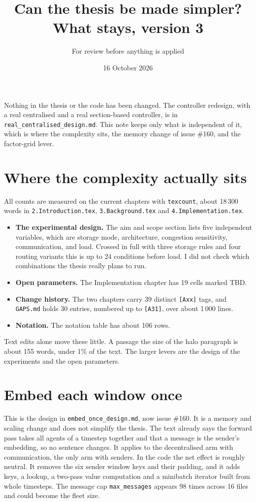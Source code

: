 \documentclass[11pt,a4paper]{article}
\title{Can the thesis be made simpler?\\[2pt]\large What stays, version 3}
\author{For review before anything is applied}
\date{16 October 2026}
\newcommand{\file}[1]{\texttt{#1}}
\begin{document}
\sloppy
\maketitle

\noindent Nothing in the thesis or the code has been changed. The controller
redesign, with a real centralised and a real section-based controller, is in
\file{real\_centralised\_design.md}. This note keeps only what is independent of
it, which is where the complexity sits, the memory change of issue \#160, and the
factor-grid lever.

\section{Where the complexity actually sits}

All counts are measured on the current chapters with \file{texcount}, about
18\,300 words in \file{2.Introduction.tex}, \file{3.Background.tex} and
\file{4.Implementation.tex}.

\begin{itemize}[noitemsep]
  \item \textbf{The experimental design.} The aim and scope section lists five
    independent variables, which are storage mode, architecture, congestion
    sensitivity, communication, and load. Crossed in full with three storage
    rules and four routing variants this is up to 24 conditions before load.
    I did not check which combinations the thesis really plans to run.
  \item \textbf{Open parameters.} The Implementation chapter has 19 cells
    marked TBD.
  \item \textbf{Change history.} The two chapters carry 39 distinct
    \texttt{[Axx]} tags, and \file{GAPS.md} holds 30 entries, numbered up to
    \texttt{[A31]}, over about 1\,000 lines.
  \item \textbf{Notation.} The notation table has about 106 rows.
\end{itemize}

Text edits alone move these little. A passage the size of the halo paragraph is
about 155 words, under 1\% of the text. The larger levers are the design of the
experiments and the open parameters.

\section{Embed each window once}

This is the design in \file{embed\_once\_design.md}, now issue \#160. It is a
memory and scaling change and does not simplify the thesis. The text already
says the forward pass takes all agents of a timestep together and that a message
is the sender's embedding, so no sentence changes. It applies to the decentralised
arm with communication, the only arm with senders. In the code the net effect is
roughly neutral. It removes the six sender window keys and their padding, and it
adds keys, a lookup, a two-pass value computation and a minibatch iterator built
from whole timesteps. The message cap \texttt{max\_messages} appears 98 times
across 16 files and could become the fleet size.
\end{document}
